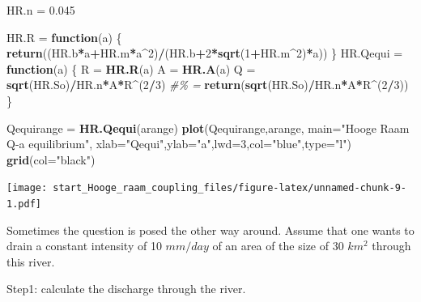 \documentclass[
]{article}
\newenvironment{Shaded}{\begin{snugshade}}{\end{snugshade}}
\newcommand{\AttributeTok}[1]{\textcolor[rgb]{0.13,0.29,0.53}{#1}}
\newcommand{\CommentTok}[1]{\textcolor[rgb]{0.56,0.35,0.01}{\textit{#1}}}
\newcommand{\ControlFlowTok}[1]{\textcolor[rgb]{0.13,0.29,0.53}{\textbf{#1}}}
\newcommand{\DecValTok}[1]{\textcolor[rgb]{0.00,0.00,0.81}{#1}}
\newcommand{\FloatTok}[1]{\textcolor[rgb]{0.00,0.00,0.81}{#1}}
\newcommand{\FunctionTok}[1]{\textcolor[rgb]{0.13,0.29,0.53}{\textbf{#1}}}
\newcommand{\NormalTok}[1]{#1}
\newcommand{\OtherTok}[1]{\textcolor[rgb]{0.56,0.35,0.01}{#1}}
\newcommand{\SpecialCharTok}[1]{\textcolor[rgb]{0.81,0.36,0.00}{\textbf{#1}}}
\newcommand{\StringTok}[1]{\textcolor[rgb]{0.31,0.60,0.02}{#1}}
\begin{document}
\begin{Shaded}
\begin{Highlighting}[]
\NormalTok{HR.n }\OtherTok{=} \FloatTok{0.045} 

\NormalTok{HR.R }\OtherTok{=} \ControlFlowTok{function}\NormalTok{(a)}
\NormalTok{\{}
  \FunctionTok{return}\NormalTok{((HR.b}\SpecialCharTok{*}\NormalTok{a}\SpecialCharTok{+}\NormalTok{HR.m}\SpecialCharTok{*}\NormalTok{a}\SpecialCharTok{\^{}}\DecValTok{2}\NormalTok{)}\SpecialCharTok{/}\NormalTok{(HR.b}\SpecialCharTok{+}\DecValTok{2}\SpecialCharTok{*}\FunctionTok{sqrt}\NormalTok{(}\DecValTok{1}\SpecialCharTok{+}\NormalTok{HR.m}\SpecialCharTok{\^{}}\DecValTok{2}\NormalTok{)}\SpecialCharTok{*}\NormalTok{a))}
\NormalTok{\}}
\NormalTok{HR.Qequi }\OtherTok{=} \ControlFlowTok{function}\NormalTok{(a)}
\NormalTok{\{}
\NormalTok{  R }\OtherTok{=} \FunctionTok{HR.R}\NormalTok{(a)}
\NormalTok{  A }\OtherTok{=} \FunctionTok{HR.A}\NormalTok{(a)}
\NormalTok{  Q }\OtherTok{=} \FunctionTok{sqrt}\NormalTok{(HR.So)}\SpecialCharTok{/}\NormalTok{HR.n}\SpecialCharTok{*}\NormalTok{A}\SpecialCharTok{*}\NormalTok{R}\SpecialCharTok{\^{}}\NormalTok{(}\DecValTok{2}\SpecialCharTok{/}\DecValTok{3}\NormalTok{) }\CommentTok{\#\% =}
  \FunctionTok{return}\NormalTok{(}\FunctionTok{sqrt}\NormalTok{(HR.So)}\SpecialCharTok{/}\NormalTok{HR.n}\SpecialCharTok{*}\NormalTok{A}\SpecialCharTok{*}\NormalTok{R}\SpecialCharTok{\^{}}\NormalTok{(}\DecValTok{2}\SpecialCharTok{/}\DecValTok{3}\NormalTok{))}
\NormalTok{\}}

\NormalTok{Qequirange }\OtherTok{=} \FunctionTok{HR.Qequi}\NormalTok{(arange)}
\FunctionTok{plot}\NormalTok{(Qequirange,arange,}
     \AttributeTok{main=}\StringTok{"Hooge Raam Q{-}a equilibrium"}\NormalTok{,}
     \AttributeTok{xlab=}\StringTok{"Qequi"}\NormalTok{,}\AttributeTok{ylab=}\StringTok{"a"}\NormalTok{,}\AttributeTok{lwd=}\DecValTok{3}\NormalTok{,}\AttributeTok{col=}\StringTok{"blue"}\NormalTok{,}\AttributeTok{type=}\StringTok{"l"}\NormalTok{)}
\FunctionTok{grid}\NormalTok{(}\AttributeTok{col=}\StringTok{"black"}\NormalTok{)}
\end{Highlighting}
\end{Shaded}

\texttt{[image: start\_Hooge\_raam\_coupling\_files/figure-latex/unnamed-chunk-9-1.pdf]}

Sometimes the question is posed the other way around. Assume that one
wants to drain a constant intensity of 10 \(mm/day\) of an area of the
size of 30 \(km^2\) through this river.

Step1: calculate the discharge through the river.
\end{document}
